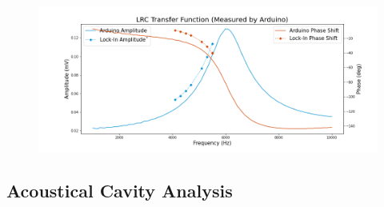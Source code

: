\documentclass[12pt]{article}
\begin{document}
    \begin{figure}
    \centering
        \includegraphics[width=\textwidth]{arduino data_}
        \caption{}
        \label{fig:LRC Arduino}
    \end{figure} %
    
    \subsection{Acoustical Cavity Analysis}
    
    
    
\end{document}
